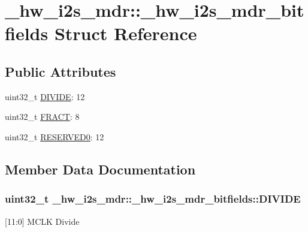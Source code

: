 \hypertarget{struct__hw__i2s__mdr_1_1__hw__i2s__mdr__bitfields}{}\section{\+\_\+hw\+\_\+i2s\+\_\+mdr\+:\+:\+\_\+hw\+\_\+i2s\+\_\+mdr\+\_\+bitfields Struct Reference}
\label{struct__hw__i2s__mdr_1_1__hw__i2s__mdr__bitfields}
\subsection*{Public Attributes}
\begin{DoxyCompactItemize}
\item 
uint32\+\_\+t \hyperlink{struct__hw__i2s__mdr_1_1__hw__i2s__mdr__bitfields_ae7b3d7e4ec5514a3307a31a620ffdae8}{D\+I\+V\+I\+DE}\+: 12
\item 
uint32\+\_\+t \hyperlink{struct__hw__i2s__mdr_1_1__hw__i2s__mdr__bitfields_a7686f44fa14863852b7ae7d727b5874a}{F\+R\+A\+CT}\+: 8
\item 
uint32\+\_\+t \hyperlink{struct__hw__i2s__mdr_1_1__hw__i2s__mdr__bitfields_ad26e91020b07f9360af2c0f2b23d89d3}{R\+E\+S\+E\+R\+V\+E\+D0}\+: 12
\end{DoxyCompactItemize}


\subsection{Member Data Documentation}
\subsubsection[{\texorpdfstring{D\+I\+V\+I\+DE}{DIVIDE}}]{\setlength{\rightskip}{0pt plus 5cm}uint32\+\_\+t \+\_\+hw\+\_\+i2s\+\_\+mdr\+::\+\_\+hw\+\_\+i2s\+\_\+mdr\+\_\+bitfields\+::\+D\+I\+V\+I\+DE}\hypertarget{struct__hw__i2s__mdr_1_1__hw__i2s__mdr__bitfields_ae7b3d7e4ec5514a3307a31a620ffdae8}{}\label{struct__hw__i2s__mdr_1_1__hw__i2s__mdr__bitfields_ae7b3d7e4ec5514a3307a31a620ffdae8}
\mbox{[}11\+:0\mbox{]} M\+C\+LK Divide 
